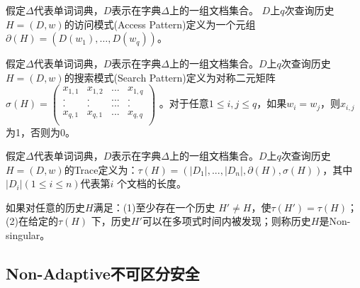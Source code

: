 \begin{defn}
\label{defn:attack_access_pattern}
假定$\Delta$代表单词词典，$D$表示在字典$\Delta$上的一组文档集合。
$D$上$q$次查询历史$H = (D,w)$的访问模式(Access Pattern)定义为一个元组 $ \partial (H)=(D(w_1 ),…,D(w_q))$。
\end{defn}



\begin{defn}
\label{defn:attack_search_pattern}
假定$\Delta$代表单词词典，$D$表示在字典$\Delta$上的一组文档集合。$D$上$q$次查询历史 $H=(D,w)$的搜索模式(Search Pattern)定义为对称二元矩阵$ \sigma(H) = \left(
  \begin{array}{cccc}
     x_{1,1} & x_{1,2} & ... & x_{1,q}  \\
    . & . & ... & . \\
    . & . & ... & . \\
     x_{q,1} & x_{q,1} & ... & x_{q,q}  \\
  \end{array}
\right)$ 。对于任意$1 \leq i,j \leq q$，如果$w_i = w_j$，则$x_{i,j}$为1，否则为0。
\end{defn}

\begin{defn}[Trace]
\label{defn:attack_trace}
假定$\Delta$代表单词词典，$D$表示在字典$\Delta$上的一组文档集合。$D$上$q$次查询历史 $H = (D,w)$的Trace定义为：$τ(H)=(|D_1 |,...,|D_n |,\partial(H),\sigma(H))$，其中$|D_i |(1 \leq i \leq n)$代表第$i$ 个文档的长度。
\end{defn}


\begin{defn}
\label{defn:attack_non_singular_history}
如果对任意的历史$H$满足：(1)至少存在一个历史 $H' \neq H$，使$\tau(H') = \tau(H)$；(2)在给定的$\tau(H)$ 下，历史$H'$可以在多项式时间内被发现；则称历史$H$是Non-singular。
\end{defn}






\subsection{\textbf{Non-Adaptive不可区分安全}}
\label{sec:search_symm_security_model_nonadaptive_indist_security}

